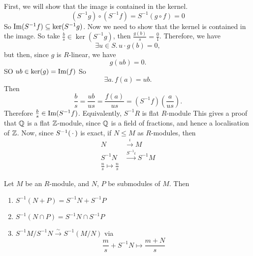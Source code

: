 \documentclass{article}
\begin{document}
\proof 
First, we will show that the image is contained in the kernel. \[ (S^{-1}g) \circ (S^{-1}f) = S^{-1}(g \circ f) = 0\]
So $\operatorname{Im}(S^{-1}f) \subseteq \ker(S^{-1}g)$.\gap 
Now we need to show that the kernel is contained in the image. So take $\frac{b}{s} \in \ker(S^{-1}g)$, then $\frac{g(b)}{s} = \frac{0}{1}$. Therefore, we have \[ \exists u \in S. \, u \cdot g(b) =0,\] but then, since $g$ is $R$-linear, we have \[ g(ub)=0.\] SO $ub \in \ker(g) = \operatorname{Im}(f)$ So \[ \exists a. \, f(a) = ub.\] Then \[ \frac{b}{s} = \frac{ub}{us} = \frac{f(a)}{us} = (S^{-1}f)\left( \frac{a}{us} \right). \] Therefore $\frac{b}{s} \in \operatorname{Im}(S^{-1}f)$. Equivalently, $S^{-1}R$ is  flat $R$-module \endproof
This gives a proof that $\mathbb{Q}$ is a flat $\mathbb{Z}$-module, since $\mathbb{Q}$ is a field of fractions, and hence a localisation of $\mathbb{Z}$.
Now, since $S^{-1}(\, \cdot \,)$ is exact, if $N \leq M$ as $R$-modules, then \begin{align*}
    N &\xrightarrow{\iota} M\\
    S^{-1}N &\xrightarrow{S^{-1}\iota} S^{-1}M\\
    \frac{n}{s} \mapsto \frac{n}{s}
\end{align*}
\begin{fancyprop}{}
    Let $M$ be an $R$-module, and $N$, $P$ be submodules of $M$. Then \begin{enumerate}
        \item $S^{-1}(N+P) = S^{-1}N + S^{-1}P$
        \item $S^{-1}(N \cap P) = S^{-1}N \cap S^{-1}P $
        \item $S^{-1}M / S^{-1}N \xrightarrow{\sim} S^{-1}(M/N)$ via \[ \frac{m}{s} + S^{-1}N \mapsto \frac{m+N}{s} \]
    \end{enumerate}
\end{fancyprop}
\proof \hspace{0.1cm}
\end{document}
